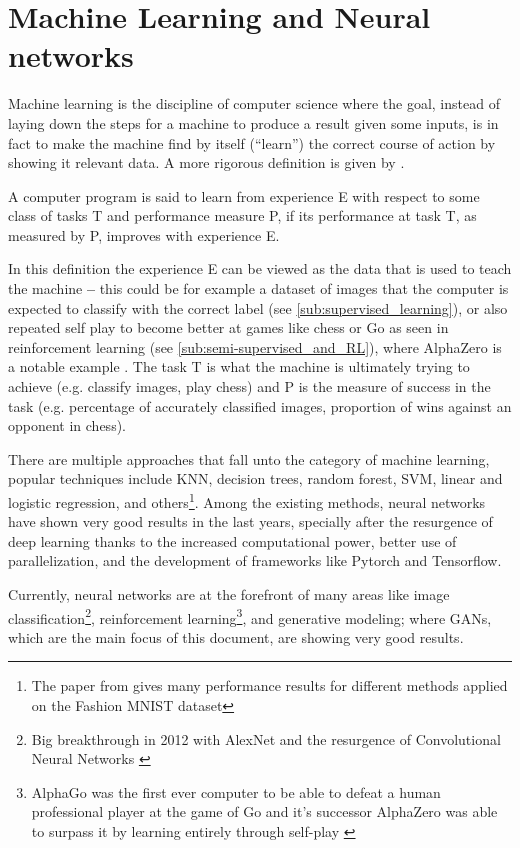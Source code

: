 
\chapter{Machine Learning and Neural networks} \label{cha:neuralNets}

Machine learning is the discipline of computer science where the goal, instead of laying down the steps for a machine to produce a result given some inputs, is in fact to make the machine find by itself (``learn'') the correct course of action by showing it relevant data. A more rigorous definition is given by \textcite{machineLearning1997}.
\begin{citacao}
    A computer program is said to learn from experience E with respect to some class of tasks T and performance measure P, if its performance at task T, as measured by P, improves with experience E. \cite[p. 2]{machineLearning1997}
\end{citacao}

In this definition the experience E can be viewed as the data that is used to teach the machine \textbf{--} this could be for example a dataset of images that the computer is expected to classify with the correct label (see \autoref{sub:supervised_learning}), or also repeated self play to become better at games like chess or Go as seen in reinforcement learning (see \autoref{sub:semi-supervised_and_RL}), where AlphaZero is a notable example \cite{alphaZero2017}.
The task T is what the machine is ultimately trying to achieve (e.g. classify images, play chess) and P is the measure of success in the task (e.g. percentage of accurately classified images, proportion of wins against an opponent in chess).

There are multiple approaches that fall unto the category of machine learning, popular techniques include \gls{KNN}, decision trees, random forest, \gls{SVM}, linear and logistic regression, and others\footnote{
    The paper from \textcite{fashionMNIST2017} gives many performance results for different methods applied on the Fashion MNIST dataset
}. Among the existing methods, neural networks have shown very good results in the last years, specially after the resurgence of deep learning thanks to the increased computational power, better use of parallelization, and the development of frameworks like Pytorch and Tensorflow.

Currently, neural networks are at the forefront of many areas like image classification\footnote{
    Big breakthrough in 2012 with AlexNet and the resurgence of Convolutional Neural Networks \cite{alexnet2012}
}, reinforcement learning\footnote{
    AlphaGo was the first ever computer to be able to defeat a human professional player at the game of Go \cite{alphaGo2016} and it's successor AlphaZero was able to surpass it by learning entirely through self-play \cite{alphaZero2017}
}, and generative modeling; where \acp{GAN}, which are the main focus of this document, are showing very good results.

